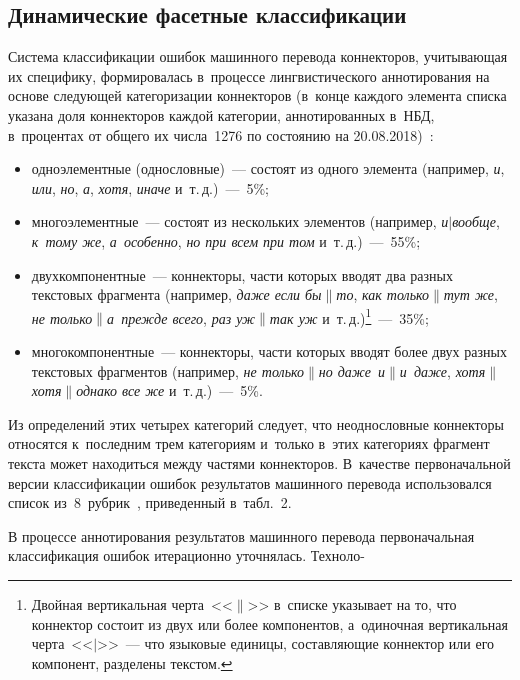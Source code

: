 \begin{multicols}{2}
\section{Динамические фасетные классификации}

  Система классификации ошибок машинного перевода коннекторов, 
учитывающая их специфику, формировалась в~процессе лингвистического 
аннотирования на основе следующей категоризации коннекторов (в~конце 
каждого элемента списка указана доля коннекторов каждой категории, 
аннотированных в~НБД, в~процентах от общего их числа~1276 по состоянию на 
20.08.2018)~\cite{15-gz}:
  \begin{itemize}
\item одноэлементные (однословные)~--- состоят из одного элемента 
(например, \textit{и}, \textit{или}, \textit{но}, \textit{а}, \textit{хотя}, 
\textit{иначе} и~т.\,д.)~---~5\%;
\item многоэлементные~--- состоят из нескольких элементов (например, 
\textit{и}$\vert$\textit{вообще}, \textit{к~тому же}, \textit{а~особенно}, 
\textit{но при всем при том} и~т.\,д.)~---~55\%;
\item двухкомпонентные~--- коннекторы, части которых вводят два разных 
текстовых фрагмента (например, \textit{даже если бы}$\|$\textit{то}, \textit{как 
только}$\|$\textit{тут же}, \textit{не только}$\|$\textit{а~прежде всего}, 
\textit{раз уж}$\|$\textit{так уж} и~т.\,д.)\footnote{Двойная вертикальная 
черта~<<$\|$>> в~списке указывает на то, что коннектор состоит из двух или более 
компонентов, а~одиночная вертикальная черта~<<$\vert$>>~--- что языковые единицы, 
составляющие коннектор или его компонент, разделены текстом.}~---~35\%;
\item многокомпонентные~--- коннекторы, части которых вводят более двух 
разных текстовых фрагментов (например, \textit{не только}$\|$\textit{но 
даже~и}$\|$\textit{и~даже}, \textit{хотя}$\|$\textit{хотя}$\|$\textit{однако все 
же} и~т.\,д.)~---~5\%.
\end{itemize}

  Из определений этих четырех категорий сле\-дует, что неоднословные 
коннекторы относятся к~послед\-ним трем категориям и~только в~этих категориях 
фрагмент текста может находиться между частями коннекторов. В~качестве 
первоначальной версии классификации ошибок результатов машинного 
перевода использовался список из~8~руб\-рик~\cite{16-gz}, приведенный 
в~табл.~2.


  В процессе аннотирования результатов машинного перевода первоначальная 
классификация ошибок итерационно уточнялась. Техноло-\linebreak


\end{multicols}
